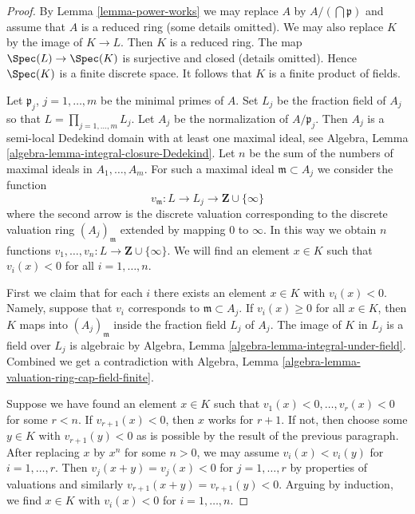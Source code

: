 \begin{proof}
By Lemma \ref{lemma-power-works} we may replace $A$ by
$A/(\bigcap \mathfrak p)$ and assume that $A$ is a reduced ring
(some details omitted).
We may also replace $K$ by the image of $K \to L$.
Then $K$ is a reduced ring. The map $\Spec(L) \to \Spec(K)$ is
surjective and closed (details omitted). Hence $\Spec(K)$ is a finite
discrete space. It follows that $K$ is a finite product of fields.

\medskip\noindent
Let $\mathfrak p_j$, $j = 1, \ldots, m$ be the minimal primes of $A$.
Set $L_j$ be the fraction field of $A_j$ so that
$L = \prod_{j = 1, \ldots, m} L_j$.
Let $A_j$ be the normalization of $A/\mathfrak p_j$. Then
$A_j$ is a semi-local Dedekind domain with at least
one maximal ideal, see
Algebra, Lemma \ref{algebra-lemma-integral-closure-Dedekind}.
Let $n$ be the sum of the numbers of maximal ideals
in $A_1, \ldots, A_m$. For such a maximal ideal $\mathfrak m \subset A_j$
we consider the function
$$
v_{\mathfrak m} : L \to L_j \to \mathbf{Z} \cup \{\infty\}
$$
where the second arrow is the discrete valuation corresponding
to the discrete valuation ring $(A_j)_{\mathfrak m}$ extended
by mapping $0$ to $\infty$. In this way we obtain $n$ functions
$v_1, \ldots, v_n : L \to \mathbf{Z} \cup \{\infty\}$.
We will find an element $x \in K$ such that $v_i(x) < 0$
for all $i = 1, \ldots, n$.

\medskip\noindent
First we claim that for each $i$ there exists an element $x \in K$
with $v_i(x) < 0$. Namely, suppose that $v_i$ corresponds to
$\mathfrak m \subset A_j$. If $v_i(x) \geq 0$ for all $x \in K$,
then $K$ maps into $(A_j)_{\mathfrak m}$ inside the fraction field
$L_j$ of $A_j$.
The image of $K$ in $L_j$ is a field over $L_j$ is
algebraic by Algebra, Lemma \ref{algebra-lemma-integral-under-field}.
Combined we get a contradiction with Algebra, Lemma
\ref{algebra-lemma-valuation-ring-cap-field-finite}.

\medskip\noindent
Suppose we have found an element $x \in K$ such that
$v_1(x) < 0, \ldots, v_r(x) < 0$ for some $r < n$. If $v_{r + 1}(x) < 0$,
then $x$ works for $r + 1$. If not, then choose some $y \in K$ with
$v_{r + 1}(y) < 0$ as is possible by the result of the previous
paragraph. After replacing $x$ by $x^n$ for some $n > 0$,
we may assume $v_i(x) < v_i(y)$ for $i = 1, \ldots, r$. Then
$v_j(x + y) = v_j(x) < 0$ for $j = 1, \ldots, r$ by properties
of valuations and similarly $v_{r + 1}(x + y) = v_{r + 1}(y) < 0$.
Arguing by induction, we find
$x \in K$ with $v_i(x) < 0$ for $i = 1, \ldots, n$.


\end{proof}
